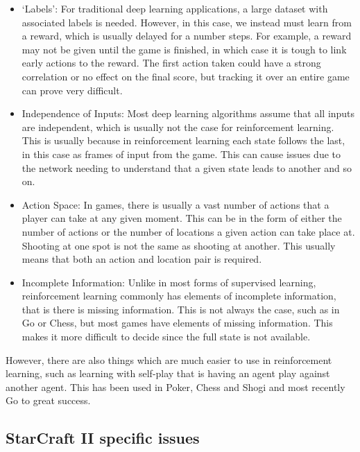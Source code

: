 \begin{itemize}
    \item `Labels': For traditional deep learning applications, a large dataset
        with associated labels is needed. However, in this case, we instead must
        learn from a reward, which is usually delayed for a number steps. For
        example, a reward may not be given until the game is finished, in which
        case it is tough to link early actions to the reward. The first
        action taken could have a strong correlation or no effect on the final
        score, but tracking it over an entire game can prove very difficult.
    \item Independence of Inputs: Most deep learning algorithms assume that
        all inputs are independent, which is usually not the case for
        reinforcement learning. This is usually because in reinforcement
        learning each state follows the last, in this case as frames of input
        from the game. This can cause issues due to the network needing to
        understand that a given state leads to another and so on.
    \item Action Space: In games, there is usually a vast number of actions that
        a player can take at any given moment. This can be in the form of either
        the number of actions or the number of locations a given action can
        take place at. Shooting at one spot is not the same as shooting at
        another. This usually means that both an action and location pair is
        required.
    \item Incomplete Information: Unlike in most forms of supervised learning,
        reinforcement learning commonly has elements of incomplete information,
        that is there is missing information. This is not always the case, such
        as in Go or Chess, but most games have elements of missing information.
        This makes it more difficult to decide since the full state is
        not available.
\end{itemize}

However, there are also things which are much easier to use in reinforcement
learning, such as learning with self-play that is having an agent play against
another agent. This has been used in Poker\cite{heinrich2016deep}, Chess and
Shogi\cite{silver2017mastering} and most recently
Go\cite{silver2016mastering,silver2017masteringgo} to great success.


\subsection{StarCraft II specific issues}%
\label{sc2-issues}%


